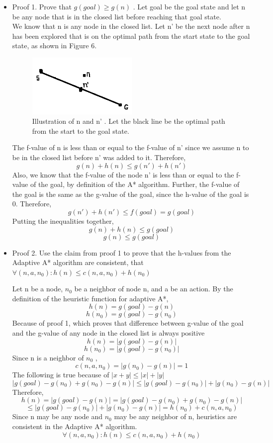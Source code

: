 \documentclass{article}
\begin{document}
\begin{itemize}
	\item Proof 1. Prove that $g(goal) \geq g(n) $ . Let goal be the goal state and let n be any node that is in the closed list before reaching that goal state.\\
	
	We know that n is any node in the closed list. Let n' be the next node after n has been explored that is on the optimal path from the start state to the goal state, as shown in Figure 6.

	\begin{figure}[h!]
  		\includegraphics[width=0.5\textwidth]{p4_0.png}
 		 \caption{Illustration of n and n' . Let the black line be the optimal path from the start to the goal state.}
	\end{figure}

	The f-value of n is less than or equal to the f-value of n' since we assume n to be in the closed list before n' was added to it. Therefore,
	\[ g(n)+h(n) \leq g(n')+h(n') \]
	 Also, we know that the f-value of the node n' is less than or equal to the f-value of the goal, by definition of the A* algorithm. Further, the f-value of the goal is the same as the g-value of the goal, since the h-value of the goal is 0. Therefore, 
	\[g(n') +h(n') \leq f(goal)=g(goal) \]
	Putting the inequalities together, 
	\[g(n)+h(n) \leq g(goal) \]
	\[g(n) \leq g(goal) \]

	\item Proof 2. Use the claim from proof 1 to prove that the h-values from the Adaptive A* algorithm are consistent, that $ \forall (n,a,n_0): h(n) \leq  c(n,a,n_0)+h(n_0)$
	
	Let n be a node, $n_0$ be a neighbor of node n, and a be an action.
	By the definition of the heuristic function for adaptive A*, 
	\[h(n)=g(goal)-g(n) \]
	\[h(n_0)=g(goal)-g(n_0) \]
	Because of proof 1, which proves that difference between g-value of the goal and the g-value of any node in the closed list is always positive
	\[h(n)=|g(goal)-g(n)| \]
	\[h(n_0)=|g(goal)-g(n_0)| \]
	Since n is a neighbor of $n_0$ ,
	\[c(n,a,n_0)=|g(n_0)-g(n)|=1 \]
	The following is true because of $|x+y|\leq|x|+|y|$
	\[|g(goal)-g(n_0)+g(n_0)-g(n)| \leq |g(goal)-g(n_0)|+|g(n_0)-g(n)| \]
	Therefore, 
	\[ h(n)= |g(goal)-g(n)| = |g(goal)-g(n_0)+g(n_0)-g(n)|  \]
	\[ \leq |g(goal)-g(n_0)|+|g(n_0)-g(n)|=h(n_0)+c(n,a,n_0) \]
	Since n may be any node and $n_0$ may be any neighbor of n, heuristics are consistent in the Adaptive A* algorithm.
	\[ \forall (n,a,n_0): h(n) \leq  c(n,a,n_0)+h(n_0)\]

\end{itemize}
\end{document}
